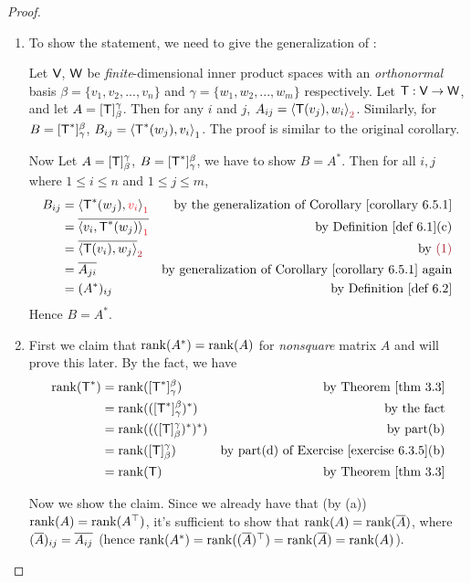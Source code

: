 \begin{proof}
\begin{enumerate}
\item To show the statement, we need to give the generalization of :

\sloppy Let \(\textsf{V}\), \(\textsf{W}\) be \emph{finite}-dimensional inner product spaces with an \emph{orthonormal} basis \(\beta = \{ v_1, v_2, ..., v_n \}\) and \(\gamma = \{ w_1, w_2, ..., w_m \}\) respectively.
Let \(\textsf{T}: \textsf{V} \to \textsf{W}\), and let \(A = [\textsf{T}]_{\beta}^{\gamma}\).
Then for any \(i\) and \(j\), \(A_{ij} = \LG \T(v_j), w_i \RG_{\MAROON{2}}\).
Similarly, for \(B = [\textsf{T}^*]_{\gamma}^{\beta}\), \(B_{ij} = \left< \textsf{T}^*(w_j), v_i \right>_1\).
The proof is similar to the original corollary.

Now Let \(A = [\textsf{T}]_{\beta}^{\gamma}\), \(B = [\textsf{T}^*]_{\gamma}^{\beta}\), we have to show \(B = A^*\).
Then for all \(i, j\) where \(1 \le i \le n\) and \(1 \le j \le m\),
\begin{align*}
    B_{ij} & = \LG \T^*(w_j), \RED{v_i} \RG_{\RED{1}} & \text{by the generalization of \CORO{6.5.1}} \\
        & = \conjugatet{\LG v_i, \T^*(w_j) \RG_{\RED{1}}} & \text{by \DEF{6.1}(c)} \\
        & = \conjugatet{\LG \T(v_i), w_j \RG}_{\MAROON{2}} & \text{by \MAROON{(1)}} \\
        & = \conjugatet{A_{ji}} & \text{by generalization of \CORO{6.5.1} again} \\
        & = (A^*)_{ij} & \text{by \DEF{6.2}}
\end{align*}
Hence \(B = A^*\).

\item First we claim that \(\mathrm{rank}(A^*) = \mathrm{rank}(A)\) for \emph{nonsquare} matrix \(A\) and will prove this later.
By the fact, we have
\begin{align*}
    \rank(\T^*) & = \rank([\T^*]_{\gamma}^{\beta}) & \text{by \THM{3.3}} \\
        & = \rank(([\T^*]_{\gamma}^{\beta})^*) & \text{by the fact} \\
        & = \rank((([\T]_{\beta}^{\gamma})^*)^*) & \text{by part(b)} \\
        & = \rank([\T]_{\beta}^{\gamma}) & \text{by part(d) of \EXEC{6.3.5}(b)} \\
        & = \rank(\T) & \text{by \THM{3.3}}
\end{align*}

Now we show the claim.
Since we already have that (by (a)) \(\mathrm{rank}(A) = \mathrm{rank}(A^\top)\), it's sufficient to show that \(\mathrm{rank}(A) = \mathrm{rank}(\overline{A})\), where \((\overline{A})_{ij} = \overline{A_{ij}}\) (hence \(\mathrm{rank}(A^*) = \mathrm{rank}((\overline{A})^\top) = \mathrm{rank}(\overline{A}) = \mathrm{rank}(A)\)).
 

\end{enumerate}
\end{proof}
